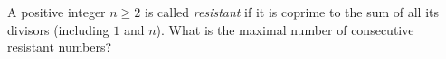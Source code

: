 A positive integer $n\geq 2$ is called \emph{resistant} if it is coprime to the sum of
all its divisors (including $1$ and $n$).
What is the maximal number of consecutive resistant numbers?
